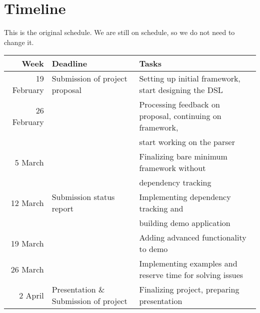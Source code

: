 \documentclass{article}
\begin{document}
	\section{Timeline}
	This is the original schedule. We are still on schedule, so we do not need to change it. \\
		\begin{tabular}{|r|l|l|} \hline
			Week & Deadline &Tasks\footnotemark  \\ \hline \hline
			19 February & Submission of project proposal & Setting up initial framework, start designing the DSL\\ \hline
			26 February &  & Processing feedback on proposal, continuing on framework,\\
			 & & start working on the parser \\ \hline
			5 March & & Finalizing bare minimum framework without \\
			 & & dependency tracking \\ \hline
			12 March & Submission status report & Implementing dependency tracking and \\
			 & & building demo application\\ \hline
			19 March & & Adding advanced functionality to demo\\ \hline
			26 March & & Implementing examples and reserve time for solving issues\\ \hline
			2 April & Presentation \& Submission of project & Finalizing project, preparing presentation\\ \hline
			
		\end{tabular}
	\\
	
\end{document}
